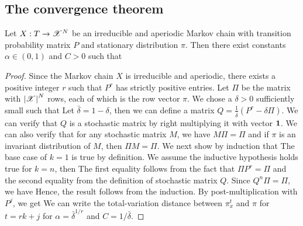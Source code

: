 \documentclass[letterpaper,english,10pt]{article}
\begin{document}
\subsection{The convergence theorem}
\begin{thm} 
Let $X: T \to \mathscr{X}^N$ be an irreducible and aperiodic Markov chain with transition probability matrix $P$ and stationary distribution $\pi$. 
Then there exist constants $\alpha \in (0,1)$ and $C > 0$ such that
\end{thm}
\begin{proof}
Since the Markov chain $X$ is irreducible and aperiodic, 
there exists a positive integer $r$ such that $P^r$ has strictly positive entries. 
Let $\Pi$ be the matrix with $\left\lvert\mathscr{X}\right\rvert^N$ rows, 
each of which is the row vector $\pi$. 
We chose a $\delta > 0$  sufficiently small such that 
Let $\bar{\delta} = 1-\delta$, then we can define a matrix $Q = \frac{1}{\bar{\delta}}(P^r- \delta\Pi)$. 
We can verify that $Q$ is a stochastic matrix by right multiplying it with vector $\mathbf{1}$. 
We can also verify that for any stochastic matrix $M$, we have $M\Pi = \Pi$ and if $\pi$ is an invariant distribution of $M$, then $\Pi M = \Pi$. 
We next show by induction that 
The base case of $k=1$ is true by definition. 
We assume the inductive hypothesis holds true for $k =n$,  then
The first equality follows from the fact that $\Pi P^r = \Pi$ and the second equality from the definition of stochastic matrix $Q$. 
Since $Q^n\Pi = \Pi$, we have 
Hence, the result follows from the induction. 
By post-multiplication with $P^j$, we get 
We can write the total-variation distance between $\pi^{t}_x$ and $\pi$ for $t=rk+j$
for $\alpha = \bar{\delta}^{1/r}$ and $C = 1/\bar{\delta}$. 
\end{proof}
\end{document}
